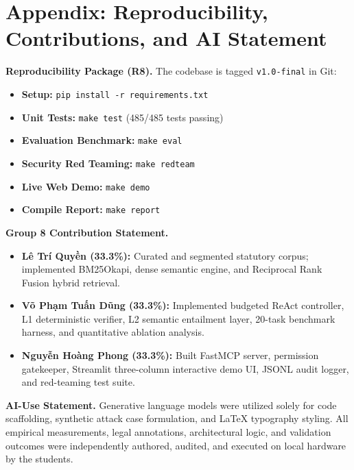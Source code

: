 \documentclass[a4paper,11pt]{article}
\newcommand{\hdr}[1]{\vspace{3pt}\noindent\textbf{#1}}
\begin{document}
\printbibliography

\newpage
\appendix
\section*{Appendix: Reproducibility, Contributions, and AI Statement}

\hdr{Reproducibility Package (R8).}
The codebase is tagged \texttt{v1.0-final} in Git:
\begin{itemize}[leftmargin=14pt,noitemsep]
    \item \textbf{Setup:} \texttt{pip install -r requirements.txt}
    \item \textbf{Unit Tests:} \texttt{make test} (485/485 tests passing)
    \item \textbf{Evaluation Benchmark:} \texttt{make eval}
    \item \textbf{Security Red Teaming:} \texttt{make redteam}
    \item \textbf{Live Web Demo:} \texttt{make demo}
    \item \textbf{Compile Report:} \texttt{make report}
\end{itemize}

\hdr{Group 8 Contribution Statement.}
\begin{itemize}[leftmargin=14pt,noitemsep]
    \item \textbf{Lê Trí Quyền (33.3\%):} Curated and segmented statutory corpus; implemented BM25Okapi, dense semantic engine, and Reciprocal Rank Fusion hybrid retrieval.
    \item \textbf{Võ Phạm Tuấn Dũng (33.3\%):} Implemented budgeted ReAct controller, L1 deterministic verifier, L2 semantic entailment layer, 20-task benchmark harness, and quantitative ablation analysis.
    \item \textbf{Nguyễn Hoàng Phong (33.3\%):} Built FastMCP server, permission gatekeeper, Streamlit three-column interactive demo UI, JSONL audit logger, and red-teaming test suite.
\end{itemize}

\hdr{AI-Use Statement.}
Generative language models were utilized solely for code scaffolding, synthetic attack case formulation, and LaTeX typography styling. All empirical measurements, legal annotations, architectural logic, and validation outcomes were independently authored, audited, and executed on local hardware by the students.
\end{document}
